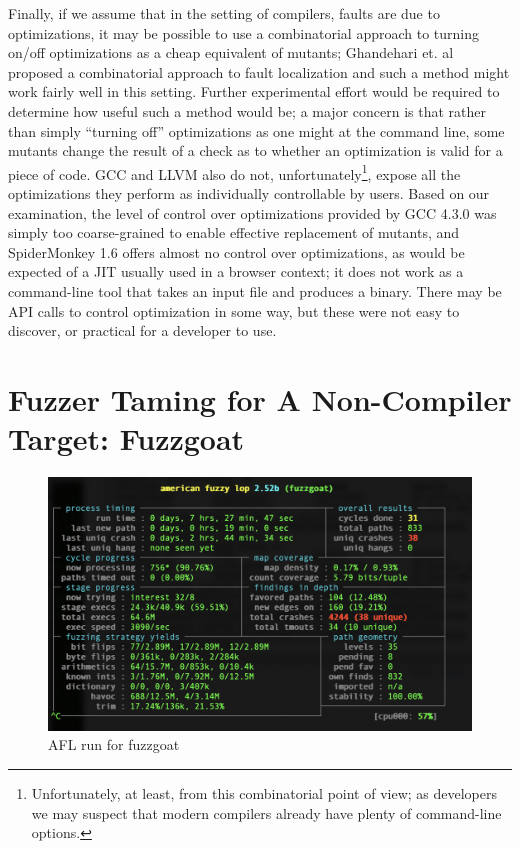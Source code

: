 Finally, if we assume that in the setting of compilers, faults are due to optimizations, it may be possible to use a combinatorial approach to turning on/off optimizations as a cheap equivalent of mutants; Ghandehari et. al \cite{CombTestFaultLoc} proposed a combinatorial approach to fault localization and such a method might work fairly well in this setting.  Further experimental effort would be required to determine how useful such a method would be; a major concern is that rather than simply ``turning off'' optimizations as one might at the command line, some mutants change the result of a check as to whether an optimization is valid for a piece of code.  GCC and LLVM also do not, unfortunately\footnote{Unfortunately, at least, from this combinatorial point of view; as developers we may suspect that modern compilers already have plenty of command-line options.}, expose all the optimizations they perform as individually controllable by users.  Based on our examination, the level of control over optimizations provided by GCC 4.3.0 was simply too coarse-grained to enable effective replacement of mutants, and SpiderMonkey 1.6 offers almost no control over optimizations, as would be expected of a JIT usually used in a browser context; it does not work as a command-line tool that takes an input file and produces a binary.  There may be API calls to control optimization in some way, but these were not easy to discover, or practical for a developer to use.

\section{Fuzzer Taming for A Non-Compiler Target: Fuzzgoat}


\begin{figure}
   \centering
        \includegraphics[width=1.0\textwidth]{afl_fuzzgoat.png}
        \caption{AFL run for fuzzgoat}
        \label{aflfuzzgoat}  
  \end{figure}

